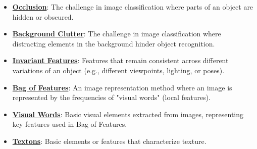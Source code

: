 \documentclass{article}%
\begin{document}
\begin{itemize}[leftmargin=*]
\item \href{https://purdue.brightspace.com/d2l/common/assets/pdfjs-d2l-dist/1.0.14-legacy/web/viewer.html?file=%2Fcontent%2Fenforced%2F1095467-wl.202510.CS.24300.001%2F07L2-Vision.pdf%3Fou%3D1095467&lang=en-us&container=d2l-fileviewer-rendered-pdf&fullscreen=d2l-fileviewer-rendered-pdf-dialog&height=667#page=9}{\textbf{Occlusion}}: The challenge in image classification where parts of an object are hidden or obscured.%
\item \href{https://purdue.brightspace.com/d2l/common/assets/pdfjs-d2l-dist/1.0.14-legacy/web/viewer.html?file=%2Fcontent%2Fenforced%2F1095467-wl.202510.CS.24300.001%2F07L2-Vision.pdf%3Fou%3D1095467&lang=en-us&container=d2l-fileviewer-rendered-pdf&fullscreen=d2l-fileviewer-rendered-pdf-dialog&height=667#page=10}{\textbf{Background Clutter}}: The challenge in image classification where distracting elements in the background hinder object recognition.%
\item \href{https://purdue.brightspace.com/d2l/common/assets/pdfjs-d2l-dist/1.0.14-legacy/web/viewer.html?file=%2Fcontent%2Fenforced%2F1095467-wl.202510.CS.24300.001%2F07L2-Vision.pdf%3Fou%3D1095467&lang=en-us&container=d2l-fileviewer-rendered-pdf&fullscreen=d2l-fileviewer-rendered-pdf-dialog&height=667#page=11}{\textbf{Invariant Features}}: Features that remain consistent across different variations of an object (e.g., different viewpoints, lighting, or poses).%
\item \href{https://purdue.brightspace.com/d2l/common/assets/pdfjs-d2l-dist/1.0.14-legacy/web/viewer.html?file=%2Fcontent%2Fenforced%2F1095467-wl.202510.CS.24300.001%2F07L2-Vision.pdf%3Fou%3D1095467&lang=en-us&container=d2l-fileviewer-rendered-pdf&fullscreen=d2l-fileviewer-rendered-pdf-dialog&height=667#page=12}{\textbf{Bag of Features}}: An image representation method where an image is represented by the frequencies of "visual words" (local features).%
\item \href{https://purdue.brightspace.com/d2l/common/assets/pdfjs-d2l-dist/1.0.14-legacy/web/viewer.html?file=%2Fcontent%2Fenforced%2F1095467-wl.202510.CS.24300.001%2F07L2-Vision.pdf%3Fou%3D1095467&lang=en-us&container=d2l-fileviewer-rendered-pdf&fullscreen=d2l-fileviewer-rendered-pdf-dialog&height=667#page=14}{\textbf{Visual Words}}: Basic visual elements extracted from images, representing key features used in Bag of Features.%
\item \href{https://purdue.brightspace.com/d2l/common/assets/pdfjs-d2l-dist/1.0.14-legacy/web/viewer.html?file=%2Fcontent%2Fenforced%2F1095467-wl.202510.CS.24300.001%2F07L2-Vision.pdf%3Fou%3D1095467&lang=en-us&container=d2l-fileviewer-rendered-pdf&fullscreen=d2l-fileviewer-rendered-pdf-dialog&height=667#page=28}{\textbf{Textons}}: Basic elements or features that characterize texture.%

\end{itemize}
\end{document}
